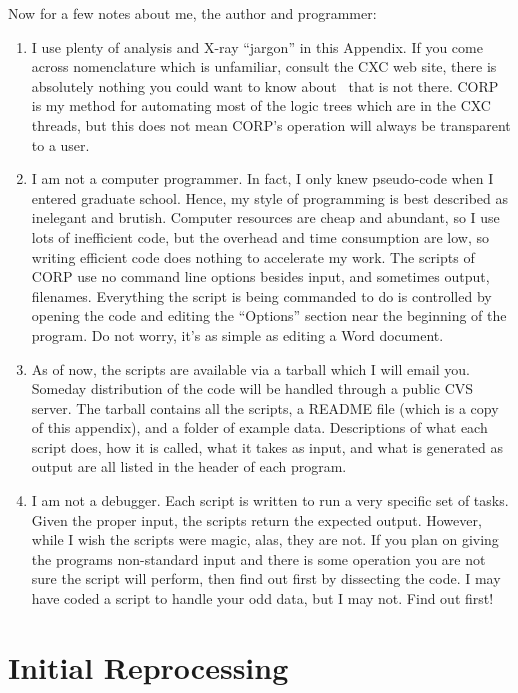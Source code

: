 Now for a few notes about me, the author and programmer:
\begin{enumerate}
\item I use plenty of analysis and X-ray ``jargon'' in this
  Appendix. If you come across nomenclature which is unfamiliar,
  consult the CXC web site, there is absolutely nothing you could want
  to know about \chandra\ that is not there. CORP is my method for
  automating most of the logic trees which are in the CXC threads, but
  this does not mean CORP's operation will always be transparent to a
  user.

\item I am not a computer programmer. In fact, I only knew pseudo-code
  when I entered graduate school. Hence, my style of programming is
  best described as inelegant and brutish. Computer resources are
  cheap and abundant, so I use lots of inefficient code, but the
  overhead and time consumption are low, so writing efficient code
  does nothing to accelerate my work. The scripts of CORP use no
  command line options besides input, and sometimes output,
  filenames. Everything the script is being commanded to do is
  controlled by opening the code and editing the ``Options'' section
  near the beginning of the program. Do not worry, it's as simple as
  editing a Word document.

\item As of now, the scripts are available via a tarball which I will
  email you. Someday distribution of the code will be handled through
  a public CVS server. The tarball contains all the scripts, a README
  file (which is a copy of this appendix), and a folder of example
  data. Descriptions of what each script does, how it is called, what
  it takes as input, and what is generated as output are all listed in
  the header of each program.

\item I am not a debugger. Each script is written to run a very
  specific set of tasks. Given the proper input, the scripts return
  the expected output. However, while I wish the scripts were magic,
  alas, they are not. If you plan on giving the programs non-standard
  input and there is some operation you are not sure the script will
  perform, then find out first by dissecting the code. I may have
  coded a script to handle your odd data, but I may not. Find out
  first!
\end{enumerate}

\section{Initial Reprocessing}

